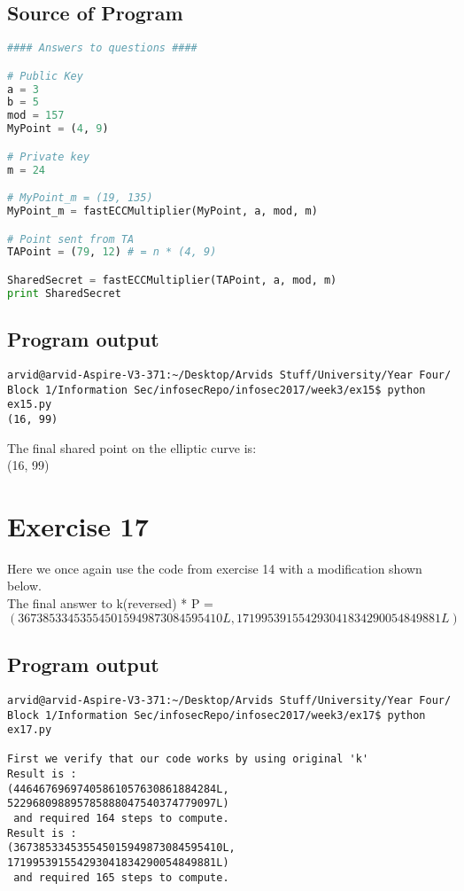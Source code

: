 \documentclass[a4paper]{article}
\begin{document}
\subsection*{Source of Program}

\begin{lstlisting}[language=Python]
#### Answers to questions ####

# Public Key
a = 3
b = 5
mod = 157
MyPoint = (4, 9)

# Private key
m = 24

# MyPoint_m = (19, 135)
MyPoint_m = fastECCMultiplier(MyPoint, a, mod, m)

# Point sent from TA
TAPoint = (79, 12) # = n * (4, 9)

SharedSecret = fastECCMultiplier(TAPoint, a, mod, m)
print SharedSecret
\end{lstlisting}

\subsection*{Program output}
\begin{verbatim}
arvid@arvid-Aspire-V3-371:~/Desktop/Arvids Stuff/University/Year Four/
Block 1/Information Sec/infosecRepo/infosec2017/week3/ex15$ python ex15.py
(16, 99)
\end{verbatim}
The final shared point on the elliptic curve is:\\
(16, 99)

\section*{Exercise 17}

Here we once again use the code from exercise 14 with a modification shown below.\\
The final answer to k(reversed) * P = \\
$(367385334535545015949873084595410L, 171995391554293041834290054849881L)$

\subsection*{Program output}

\begin{verbatim}
arvid@arvid-Aspire-V3-371:~/Desktop/Arvids Stuff/University/Year Four/
Block 1/Information Sec/infosecRepo/infosec2017/week3/ex17$ python ex17.py

First we verify that our code works by using original 'k'
Result is :
(44646769697405861057630861884284L, 522968098895785888047540374779097L)
 and required 164 steps to compute.
Result is :
(367385334535545015949873084595410L, 171995391554293041834290054849881L)
 and required 165 steps to compute.
\end{verbatim}
\end{document}
